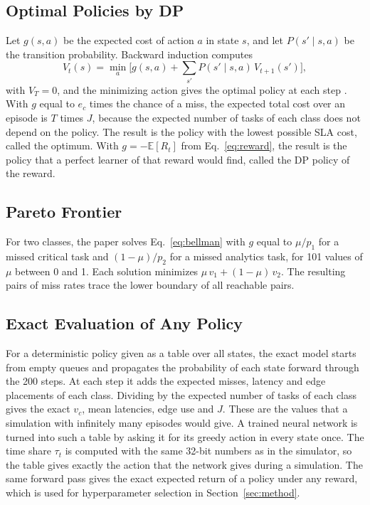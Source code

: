 \documentclass[journal]{IEEEtran}
\begin{document}
\subsection{Optimal Policies by DP}
Let $g(s,a)$ be the expected cost of action $a$ in state $s$, and let $P(s' \mid s,a)$ be the transition probability. Backward induction computes
\begin{equation}
V_t(s) = \min_{a} \Big[ g(s,a) + \sum_{s'} P(s' \mid s, a)\, V_{t+1}(s') \Big],
\label{eq:bellman}
\end{equation}
with $V_T = 0$, and the minimizing action gives the optimal policy at each step \cite{puterman1994}. With $g$ equal to $e_c$ times the chance of a miss, the expected total cost over an episode is $T$ times $J$, because the expected number of tasks of each class does not depend on the policy. The result is the policy with the lowest possible SLA cost, called the optimum. With $g = -\mathbb{E}[R_t]$ from Eq.~\eqref{eq:reward}, the result is the policy that a perfect learner of that reward would find, called the DP policy of the reward.

\subsection{Pareto Frontier}
For two classes, the paper solves Eq.~\eqref{eq:bellman} with $g$ equal to $\mu/p_1$ for a missed critical task and $(1-\mu)/p_2$ for a missed analytics task, for 101 values of $\mu$ between 0 and 1. Each solution minimizes $\mu\, v_1 + (1-\mu)\, v_2$. The resulting pairs of miss rates trace the lower boundary of all reachable pairs.

\subsection{Exact Evaluation of Any Policy}
For a deterministic policy given as a table over all states, the exact model starts from empty queues and propagates the probability of each state forward through the 200 steps. At each step it adds the expected misses, latency and edge placements of each class. Dividing by the expected number of tasks of each class gives the exact $v_c$, mean latencies, edge use and $J$. These are the values that a simulation with infinitely many episodes would give. A trained neural network is turned into such a table by asking it for its greedy action in every state once. The time share $\tau_t$ is computed with the same 32-bit numbers as in the simulator, so the table gives exactly the action that the network gives during a simulation. The same forward pass gives the exact expected return of a policy under any reward, which is used for hyperparameter selection in Section~\ref{sec:method}.
\end{document}
